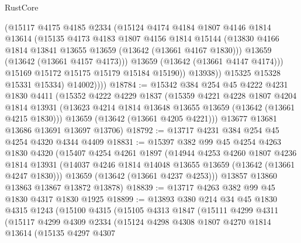 \begin{lexlean}{RustCore}
\begin{coremodule}
                    (@15117
                      @4175
                      @4185
                      @2334
                      (@15124
                        @4174
                        @4184
                        @1807
                        @4146
                        @1814
                        @13614
                        (@15135
                          @4173
                          @4183
                          @1807
                          @4156
                          @1814
                          @15144
                          (@13830 @4166 @1814 @13841 @13655 @13659 (@13642 (@13661 @4167 @1830)))
                          @13659
                          (@13642 (@13661 @4157 @4173)))
                        @13659
                        (@13642 (@13661 @4147 @4174)))
                      @15169
                      @15172
                      @15175
                      @15179
                      @15184
                      @15190))
                  @13938))
              @15325
              @15328
              @15331
              @15334)
            @14002))))
@18784 := @15342
    @384
    @254
    @45
    @4222
    @4231
    @1830
    @4411
    (@15352
      @4222
      @4229
      @1837
      (@15359
        @4221
        @4228
        @1807
        @4204
        @1814
        @13931
        (@13623 @4214 @1814 @13648 @13655 @13659 (@13642 (@13661 @4215 @1830)))
        @13659
        (@13642 (@13661 @4205 @4221)))
      @13677
      @13681
      @13686
      @13691
      @13697
      @13706)
@18792 := @13717 @4231 @384 @254 @45 @4254 @4320 @4344 @4409
@18831 := @15397
    @382
    @99
    @45
    @4254
    @4263
    @1830
    @4320
    (@15407
      @4254
      @4261
      @1897
      (@14944
        @4253
        @4260
        @1807
        @4236
        @1814
        @13931
        (@14037 @4246 @1814 @14048 @13655 @13659 (@13642 (@13661 @4247 @1830)))
        @13659
        (@13642 (@13661 @4237 @4253)))
      @13857
      @13860
      @13863
      @13867
      @13872
      @13878)
@18839 := @13717 @4263 @382 @99 @45 @1830 @4317 @1830 @1925
@18899 := @13893
    @380
    @214
    @34
    @45
    @1830
    @4315
    @1243
    (@15100
      @4315
      (@15105
        @4313
        @1847
        (@15111
          @4299
          @4311
          (@15117
            @4299
            @4309
            @2334
            (@15124
              @4298
              @4308
              @1807
              @4270
              @1814
              @13614
              (@15135
                @4297
                @4307

\end{coremodule}
\end{lexlean}
